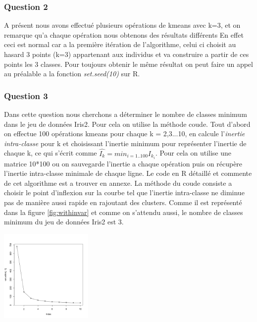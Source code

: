 \documentclass[10pt]{article}
\begin{document}
\subsubsection{Question 2}

A présent nous avons effectué plusieurs opérations de kmeans avec k=3, et on remarque qu'a chaque opération nous obtenons des résultats différents En effet ceci est normal car a la première itération de l'algorithme, celui ci choisit au hasard 3 points (k=3) appartenant aux individus et va construire a partir de ces points les 3 classes. Pour toujours obtenir le même résultat on peut faire un appel  au préalable a la fonction \textit{set.seed(10)} sur R.
	
\subsubsection{Question 3}	
	
Dans cette question nous cherchons a déterminer le nombre de classes minimum dans le jeu de données Iris2. Pour cela on utilise la méthode coude.  Tout d'abord on effectue 100 opérations kmeans pour chaque k = 2,3...10, en calcule l'\textit{inertie intra-classe} pour k et choisissant l'inertie minimum pour représenter l'inertie de chaque k, ce qui s'écrit comme $\hat{I_{k}} = min_{i=1..100} I_{k_{i}}$. Pour cela on utilise une matrice 10*100 ou on sauvegarde l'inertie a chaque opération puis on récupère l'inertie intra-classe minimale de chaque ligne. Le code en R détaillé et commente de cet algorithme est a trouver en annexe.
La méthode du coude consiste a choisir le point d'inflexion sur la courbe tel que l'inertie intra-classe ne diminue pas de manière aussi rapide en rajoutant des clusters.  Comme il est représenté dans la figure \ref{fig:withinvar} et comme on s'attendu aussi, le nombre de classes minimum du jeu de données Iris2 est 3. \\
	
\begin{center}
	\includegraphics[width=45mm]{Figures/Iris_2/withinvar.png}
	\label{fig:withinvar}
\end{center}
\end{document}
